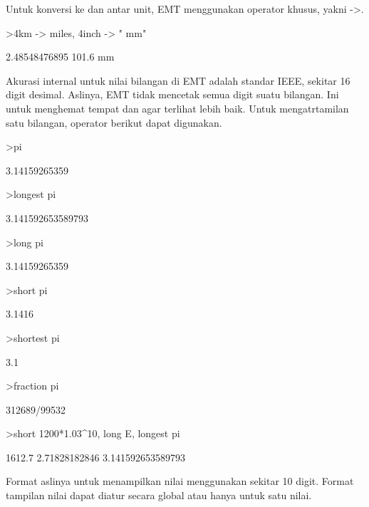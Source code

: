 \documentclass[a4paper,10pt]{article}
\begin{document}
\begin{eulernotebook}
\begin{eulercomment}
\begin{eulercomment}
\begin{eulercomment}
\begin{eulercomment}
\begin{eulercomment}
Untuk konversi ke dan antar unit, EMT menggunakan operator khusus,
yakni -\textgreater{}.
\end{eulercomment}
\begin{eulerprompt}
>4km -> miles, 4inch -> " mm"
\end{eulerprompt}
\begin{euleroutput}
  2.48548476895
  101.6 mm
\end{euleroutput}
\begin{eulercomment}
Akurasi internal untuk nilai bilangan di EMT adalah standar IEEE,
sekitar 16 digit desimal. Aslinya, EMT tidak mencetak semua digit
suatu bilangan. Ini untuk menghemat tempat dan agar terlihat lebih
baik. Untuk mengatrtamilan satu bilangan, operator berikut dapat
digunakan.

\end{eulercomment}
\begin{eulerprompt}
>pi
\end{eulerprompt}
\begin{euleroutput}
  3.14159265359
\end{euleroutput}
\begin{eulerprompt}
>longest pi
\end{eulerprompt}
\begin{euleroutput}
        3.141592653589793 
\end{euleroutput}
\begin{eulerprompt}
>long pi
\end{eulerprompt}
\begin{euleroutput}
  3.14159265359
\end{euleroutput}
\begin{eulerprompt}
>short pi
\end{eulerprompt}
\begin{euleroutput}
  3.1416
\end{euleroutput}
\begin{eulerprompt}
>shortest pi
\end{eulerprompt}
\begin{euleroutput}
     3.1 
\end{euleroutput}
\begin{eulerprompt}
>fraction pi
\end{eulerprompt}
\begin{euleroutput}
  312689/99532
\end{euleroutput}
\begin{eulerprompt}
>short 1200*1.03^10, long E, longest pi
\end{eulerprompt}
\begin{euleroutput}
  1612.7
  2.71828182846
        3.141592653589793 
\end{euleroutput}
\begin{eulercomment}
Format aslinya untuk menampilkan nilai menggunakan sekitar 10 digit.
Format tampilan nilai dapat diatur secara global atau hanya untuk satu
nilai.


\end{eulercomment}
\end{eulercomment}
\end{eulercomment}
\end{eulercomment}
\end{eulercomment}
\end{eulernotebook}
\end{document}
